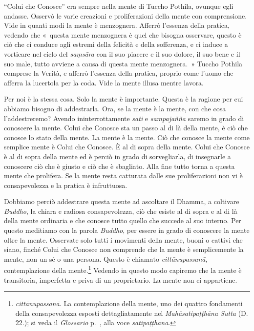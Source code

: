 ``Colui che Conosce'' era sempre nella mente di Tuccho Pothila, ovunque
egli andasse. Osservò le varie creazioni e proliferazioni della mente
con comprensione. Vide in quanti modi la mente è menzognera. Afferrò
l'essenza della pratica, vedendo che «~questa mente menzognera è quel
che bisogna osservare, questo è ciò che ci conduce agli estremi della
felicità e della sofferenza, e ci induce a vorticare nel ciclo del
\emph{saṃsāra} con il suo piacere e il suo dolore, il suo bene e il suo
male, tutto avviene a causa di questa mente menzognera.~» Tuccho Pothila
comprese la Verità, e afferrò l'essenza della pratica, proprio come
l'uomo che afferra la lucertola per la coda. Vide la mente illusa mentre
lavora.

Per noi è la stessa cosa. Solo la mente è importante. Questa è la
ragione per cui abbiamo bisogno di addestrarla. Ora, se la mente è la
mente, con che cosa l'addestreremo? Avendo ininterrottamente \emph{sati}
e \emph{sampajañña} saremo in grado di conoscere la mente. Colui che
Conosce sta un passo al di là della mente, è ciò che conosce lo stato
della mente. La mente è la mente. Ciò che conosce la mente come semplice
mente è Colui che Conosce. È al di sopra della mente. Colui che Conosce
è al di sopra della mente ed è perciò in grado di sorvegliarla, di
insegnarle a conoscere ciò che è giusto e ciò che è sbagliato. Alla fine
tutto torna a questa mente che prolifera. Se la mente resta catturata
dalle sue proliferazioni non vi è consapevolezza e la pratica è
infruttuosa.

Dobbiamo perciò addestrare questa mente ad ascoltare il Dhamma, a
coltivare \emph{Buddho}, la chiara e radiosa consapevolezza, ciò che
esiste al di sopra e al di là della mente ordinaria e che conosce tutto
quello che succede al suo interno. Per questo meditiamo con la parola
\emph{Buddho}, per essere in grado di conoscere la mente oltre la mente.
Osservate solo tutti i movimenti della mente, buoni o cattivi che siano,
finché Colui che Conosce non comprende che la mente è semplicemente la
mente, non un sé o una persona. Questo è chiamato \emph{cittānupassanā},
contemplazione della mente.\footnote{\emph{cittānupassanā.} La
  contemplazione della mente, uno dei quattro fondamenti della
  consapevolezza esposti dettagliatamente nel
  \emph{Mahāsatipaṭṭhāna Sutta} (D. 22.); si veda il
  \emph{Glossario} p.~\pageref{glossary-satipatthana}, alla voce \emph{satipaṭṭhāna}.} Vedendo in questo
modo capiremo che la mente è transitoria, imperfetta e priva di un
proprietario. La mente non ci appartiene.

